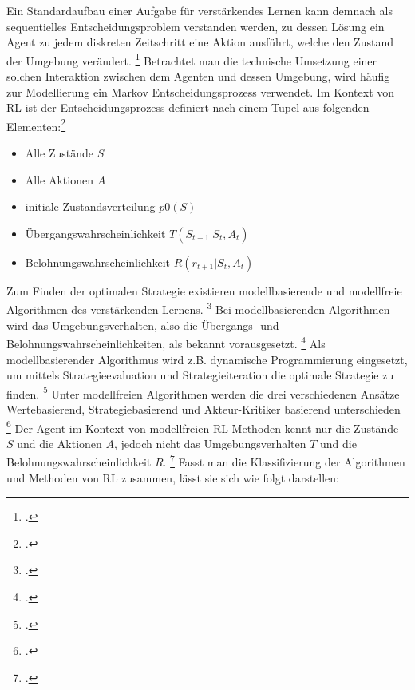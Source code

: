 Ein Standardaufbau einer Aufgabe für verstärkendes Lernen kann demnach als sequentielles Entscheidungsproblem verstanden werden, zu dessen Lösung ein Agent zu jedem diskreten Zeitschritt eine Aktion ausführt, welche den Zustand der Umgebung verändert. \footcite[Vgl.][S. 2]{Zhao.2020}
Betrachtet man die technische Umsetzung einer solchen Interaktion zwischen dem Agenten und dessen Umgebung, wird häufig zur Modellierung ein Markov Entscheidungsprozess verwendet.
Im Kontext von RL ist der Entscheidungsprozess definiert nach einem Tupel aus folgenden Elementen:\footcite[Vgl.][S. 2]{Zhang.2018}
\begin{itemize}
    \item Alle Zustände $S$
    \item Alle Aktionen $A$
    \item initiale Zustandsverteilung $p0(S)$
    \item Übergangswahrscheinlichkeit $T(S_{t+1}|S_{t},A_{t})$
    \item Belohnungswahrscheinlichkeit $R(r_{t+1}|S_{t},A_{t})$
\end{itemize}

Zum Finden der optimalen Strategie existieren modellbasierende und modellfreie Algorithmen des verstärkenden Lernens. \footcite[Vgl.][S. 3]{Wang.2020}
Bei modellbasierenden Algorithmen wird das Umgebungsverhalten, also die Übergangs- und Belohnungswahrscheinlichkeiten, als bekannt vorausgesetzt. \footcite[Vgl.][S. 3]{Wang.2020}
Als modellbasierender Algorithmus wird z.B. dynamische Programmierung eingesetzt, um mittels Strategieevaluation und Strategieiteration die optimale Strategie zu finden. \footcite[Vgl.][S. 5]{Li.2019}
Unter modellfreien Algorithmen werden die drei verschiedenen Ansätze Wertebasierend, Strategiebasierend und Akteur-Kritiker basierend unterschieden \footcite[Vgl.][S. 5]{Li.2019}
Der Agent im Kontext von modellfreien RL Methoden kennt nur die Zustände $S$ und die Aktionen $A$, jedoch nicht das Umgebungsverhalten $T$ und die Belohnungswahrscheinlichkeit $R$. \footcite[Vgl.][S. 2]{Cutler.2014}
Fasst man die Klassifizierung der Algorithmen und Methoden von RL zusammen, lässt sie sich wie folgt darstellen:

